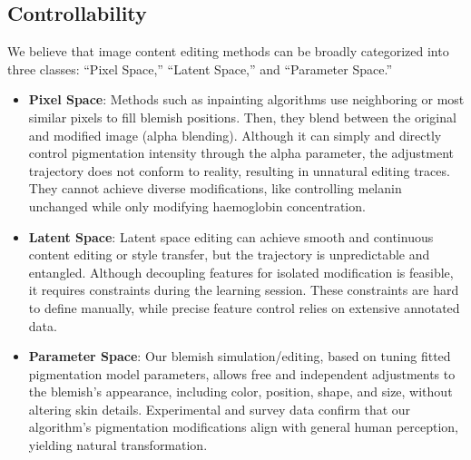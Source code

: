 \begin{spacing}{1.5}
\subsection{Controllability}
We believe that image content editing methods can be broadly categorized into three classes: “Pixel Space,” “Latent Space,” and “Parameter Space.”
\begin{itemize}
    \item \textbf{Pixel Space}: Methods such as inpainting algorithms use neighboring or most similar pixels to fill blemish positions\cite{doi:10.1080/10867651.2004.10487596, bertalmio2001navier}. Then, they blend between the original and modified image (alpha blending). Although it can simply and directly control pigmentation intensity through the alpha parameter, the adjustment trajectory does not conform to reality, resulting in unnatural editing traces. They cannot achieve diverse modifications, like controlling melanin unchanged while only modifying haemoglobin concentration.

    \item \textbf{Latent Space}: Latent space editing can achieve smooth and continuous content editing or style transfer, but the trajectory is unpredictable and entangled. Although decoupling features for isolated modification is feasible, it requires constraints during the learning session. These constraints are hard to define manually, while precise feature control relies on extensive annotated data.

    \item \textbf{Parameter Space}: Our blemish simulation/editing, based on tuning fitted pigmentation model parameters, allows free and independent adjustments to the blemish's appearance, including color, position, shape, and size, without altering skin details. Experimental and survey data confirm that our algorithm's pigmentation modifications align with general human perception, yielding natural transformation.
\end{itemize}

\end{spacing}
\newpage
